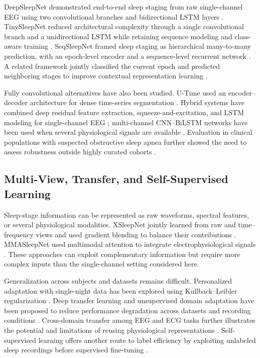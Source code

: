 \documentclass[conference]{IEEEtran}
\begin{document}
DeepSleepNet demonstrated end-to-end sleep staging from raw single-channel EEG using two convolutional branches and bidirectional LSTM layers \cite{supratak2017deepsleepnet}. TinySleepNet reduced architectural complexity through a single convolutional branch and a unidirectional LSTM while retaining sequence modeling and class-aware training \cite{supratak2020tinysleepnet}. SeqSleepNet framed sleep staging as hierarchical many-to-many prediction, with an epoch-level encoder and a sequence-level recurrent network \cite{phan2019seqsleepnet}. A related framework jointly classified the current epoch and predicted neighboring stages to improve contextual representation learning \cite{phan2018joint}.

Fully convolutional alternatives have also been studied. U-Time used an encoder--decoder architecture for dense time-series segmentation \cite{perslev2019utime}. Hybrid systems have combined deep residual feature extraction, squeeze-and-excitation, and LSTM modeling for single-channel EEG \cite{li2023hybrid}; multi-channel CNN--BiLSTM networks have been used when several physiological signals are available \cite{toma2023multichannel}. Evaluation in clinical populations with suspected obstructive sleep apnea further showed the need to assess robustness outside highly curated cohorts \cite{korkalainen2019clinical}.

\subsection{Multi-View, Transfer, and Self-Supervised Learning}

Sleep-stage information can be represented as raw waveforms, spectral features, or several physiological modalities. XSleepNet jointly learned from raw and time--frequency views and used gradient blending to balance their contributions \cite{phan2022xsleepnet}. MMASleepNet used multimodal attention to integrate electrophysiological signals \cite{zheng2022mmasleepnet}. These approaches can exploit complementary information but require more complex inputs than the single-channel setting considered here.

Generalization across subjects and datasets remains difficult. Personalized adaptation with single-night data has been explored using Kullback--Leibler regularization \cite{phan2020personalized}. Deep transfer learning and unsupervised domain adaptation have been proposed to reduce performance degradation across datasets and recording conditions \cite{phan2020transfer,fan2022domain}. Cross-domain transfer among EEG and ECG tasks further illustrates the potential and limitations of reusing physiological representations \cite{yang2023cross}. Self-supervised learning offers another route to label efficiency by exploiting unlabeled sleep recordings before supervised fine-tuning \cite{eldele2023selfsupervised}.
\end{document}
